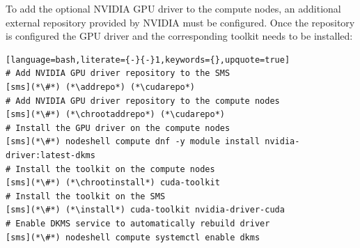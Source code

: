 To add the optional NVIDIA GPU driver to the compute nodes, an
additional external \pkgmgr{} repository provided by NVIDIA
must be configured. Once the repository is configured the
GPU driver and the corresponding toolkit needs to be installed:

\begin{lstlisting}[language=bash,literate={-}{-}1,keywords={},upquote=true]
# Add NVIDIA GPU driver repository to the SMS
[sms](*\#*) (*\addrepo*) (*\cudarepo*)
# Add NVIDIA GPU driver repository to the compute nodes
[sms](*\#*) (*\chrootaddrepo*) (*\cudarepo*)
# Install the GPU driver on the compute nodes
[sms](*\#*) nodeshell compute dnf -y module install nvidia-driver:latest-dkms
# Install the toolkit on the compute nodes
[sms](*\#*) (*\chrootinstall*) cuda-toolkit
# Install the toolkit on the SMS
[sms](*\#*) (*\install*) cuda-toolkit nvidia-driver-cuda
# Enable DKMS service to automatically rebuild driver
[sms](*\#*) nodeshell compute systemctl enable dkms
\end{lstlisting}
